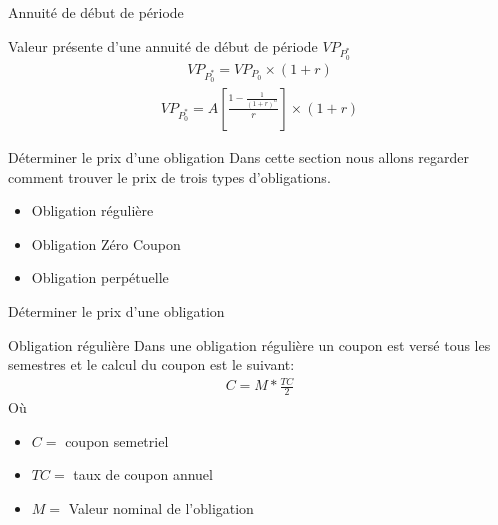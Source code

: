 \documentclass{beamer}
\begin{document}
\begin{frame}{Annuité de début de période}
\begin{block}{Valeur présente d'une annuité de début de période $VP_{P_0^*}$}
\begin{align*}
VP_{P_0^*}=VP_{P_0} \times (1+r)
\end{align*}
\begin{align*}
VP_{P_0^*}=A \left[ \frac{1-\frac{1}{(1+r)^n}}{r} \right] \times (1+r)
\end{align*}
\end{block}
\end{frame}

\begin{frame}{Déterminer le prix d'une obligation}
Dans cette section nous allons regarder comment trouver le prix de trois types d'obligations.
\begin{itemize}
\item Obligation régulière 
\item Obligation Zéro Coupon
\item Obligation perpétuelle
\end{itemize}
\end{frame}


\begin{frame}{Déterminer le prix d'une obligation}
\begin{block}{Obligation régulière}
Dans une obligation régulière un coupon est versé tous les semestres et le calcul du coupon est le suivant:
\begin{align*}
C= M * \frac{TC}{2}
\end{align*}
Où 
\begin{itemize}
\item $C=$ coupon semetriel 
\item $TC=$ taux de coupon annuel 
\item $M=$ Valeur nominal de l'obligation 
\end{itemize}

\end{block}
\end{frame}
\end{document}

